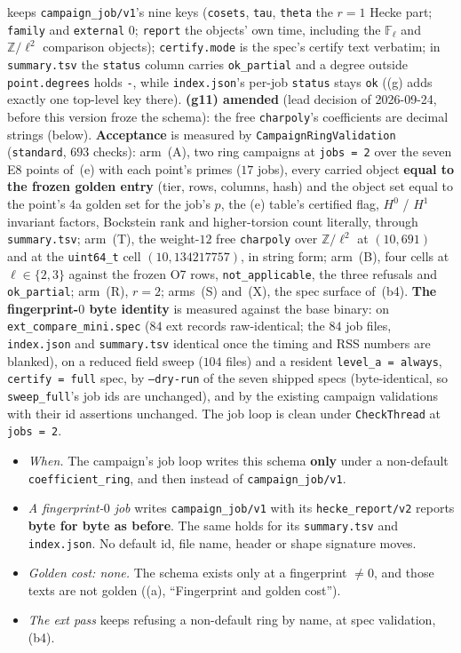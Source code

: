 \documentclass[11pt]{article}
\theoremstyle{remark}
\newcommand{\F}{\mathbb{F}}
\newcommand{\Z}{\mathbb{Z}}
\newcommand{\Fl}{\F_\ell}
\begin{document}
keeps \texttt{campaign\_job/v1}'s nine keys (\texttt{cosets}, \texttt{tau}, \texttt{theta} the
$r=1$ Hecke part; \texttt{family} and \texttt{external} $0$; \texttt{report} the objects' own
time, including the $\Fl$ and $\Z/\ell^2$ comparison objects); \texttt{certify.mode} is the spec's
certify text verbatim; in \texttt{summary.tsv} the \texttt{status} column carries
\texttt{ok\_partial} and a degree outside \texttt{point.degrees} holds \texttt{-}, while
\texttt{index.json}'s per-job \texttt{status} stays \texttt{ok} ((g) adds exactly one top-level key
there). \textbf{(g11) amended} (lead decision of 2026-09-24, before this version froze the
schema): the free \texttt{charpoly}'s coefficients are decimal strings (below). \textbf{Acceptance}
is measured by \texttt{CampaignRingValidation} (\texttt{standard}, $693$ checks): arm~(A), two ring
campaigns at \texttt{jobs = 2} over the seven E8 points of~(e) with each point's primes
($17$ jobs), every carried object \textbf{equal to the frozen golden entry} (tier, rows, columns,
hash) and the object set equal to the point's 4a golden set for the job's $p$, the (e) table's
certified flag, $H^0$ / $H^1$ invariant factors, Bockstein rank and higher-torsion count literally,
through \texttt{summary.tsv}; arm~(T), the weight-$12$ free \texttt{charpoly} over $\Z/\ell^2$ at
$(10,691)$ and at the \texttt{uint64\_t} cell $(10,134217757)$, in string form; arm~(B), four cells
at $\ell\in\{2,3\}$ against the frozen O7 rows, \texttt{not\_applicable}, the three refusals and
\texttt{ok\_partial}; arm~(R), $r=2$; arms~(S) and~(X), the spec surface of~(b4).
\textbf{The fingerprint-$0$ byte identity} is measured against the base binary: on
\texttt{ext\_compare\_mini.spec} ($84$ ext records raw-identical; the $84$ job files,
\texttt{index.json} and \texttt{summary.tsv} identical once the timing and RSS numbers are blanked),
on a reduced field sweep ($104$ files) and a resident \texttt{level\_a = always},
\texttt{certify = full} spec, by \texttt{--dry-run} of the seven shipped specs (byte-identical, so
\texttt{sweep\_full}'s job ids are unchanged), and by the existing campaign validations with their
id assertions unchanged. The job loop is clean under \texttt{CheckThread} at
\texttt{jobs = 2}.\par\endgroup
\begin{itemize}
\item \emph{When.} The campaign's job loop writes this schema \textbf{only} under a non-default
  \texttt{coefficient\_ring}, and then instead of \texttt{campaign\_job/v1}.
\item \emph{A fingerprint-$0$ job} writes \texttt{campaign\_job/v1} with its
  \texttt{hecke\_report/v2} reports \textbf{byte for byte as before}. The same holds for its
  \texttt{summary.tsv} and \texttt{index.json}. No default id, file name, header or shape
  signature moves.
\item \emph{Golden cost: none.} The schema exists only at a fingerprint $\ne0$, and those texts are
  not golden ((a), ``Fingerprint and golden cost'').
\item \emph{The ext pass} keeps refusing a non-default ring by name, at spec validation, (b4).
\end{itemize}
\end{document}
